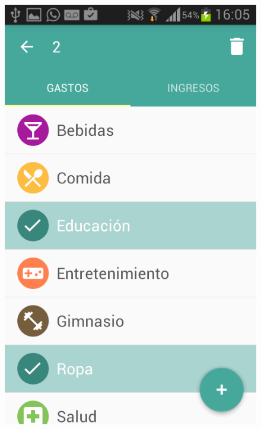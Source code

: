 \begin{figure}[ht]
\begin{minipage}{.5\textwidth}
  \includegraphics[scale=0.30,type=png,ext=.png,read=.png]{imagenes/Screenshots/select_categories}
  \captionsetup{justification=centering}
  \label{fig:interfazEliminarCategorias}
\end{minipage}
\end{figure}

